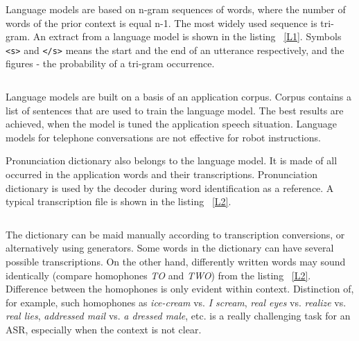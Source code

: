 \documentclass[11pt,a4paper]{report}
\begin{document}
 Language models are based on n-gram sequences of words, where
the number of words of the prior context is equal n-1. The most widely used sequence is
tri-gram. An extract from a language model is shown in the listing ~\ref{L1}.
Symbols \texttt{<s>} and \texttt{</s>} means the start and the end of an utterance respectively,
and the figures - the probability of a tri-gram occurrence. 


\begin{lstlisting}[caption=An extract from a language model, label=L1]
\end{lstlisting}

Language models are built on a basis of an application corpus. Corpus contains
a list of sentences that are used to train the language model.  The best
results are achieved, when the model is tuned the application speech situation.
Language models for telephone conversations are not effective for robot
instructions. 

Pronunciation dictionary also belongs to the language model. It is made of all
occurred  in the application words and their transcriptions.
Pronunciation dictionary is used by the decoder during word identification as a
reference. A typical transcription file is shown in the listing  ~\ref{L2}.


\begin{lstlisting}[caption=Pronunciation Dictionary, label=L2]
\end{lstlisting}

The dictionary can be maid manually according to  transcription conversions, 
or alternatively using generators.  Some words in the
dictionary can have several possible transcriptions. On the other hand,
differently written words may sound identically (compare homophones \textit
{TO} and \textit {TWO}) from the listing ~\ref{L2}. Difference between the
homophones is only evident within context. Distinction of, for example, such
homophones as \textit {ice-cream} vs. \textit {I scream}, \textit {real eyes}
vs. \textit{realize} vs. \textit {real lies}, \textit {addressed mail} vs.
\textit {a dressed male}, etc.  is a really challenging task for an ASR,
especially when the context is not clear.  
\end{document}
